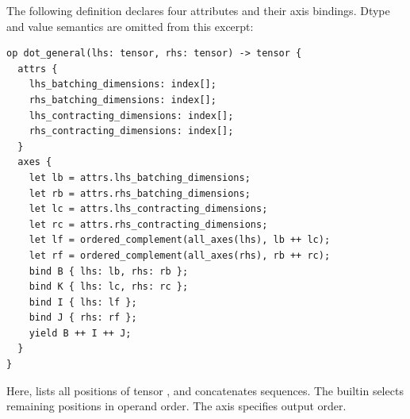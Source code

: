 The following  definition declares four attributes and their
axis bindings. Dtype and value semantics are omitted from this excerpt:
\clearpage
\begin{codeblock}[H]
\begin{lstlisting}[language=TEPL]
op dot_general(lhs: tensor, rhs: tensor) -> tensor {
  attrs {
    lhs_batching_dimensions: index[];
    rhs_batching_dimensions: index[];
    lhs_contracting_dimensions: index[];
    rhs_contracting_dimensions: index[];
  }
  axes {
    let lb = attrs.lhs_batching_dimensions;
    let rb = attrs.rhs_batching_dimensions;
    let lc = attrs.lhs_contracting_dimensions;
    let rc = attrs.rhs_contracting_dimensions;
    let lf = ordered_complement(all_axes(lhs), lb ++ lc);
    let rf = ordered_complement(all_axes(rhs), rb ++ rc);
    bind B { lhs: lb, rhs: rb };
    bind K { lhs: lc, rhs: rc };
    bind I { lhs: lf };
    bind J { rhs: rf };
    yield B ++ I ++ J;
  }
}
\end{lstlisting}
\end{codeblock}
Here,  lists all positions of tensor , and \code{++}
concatenates sequences. The builtin  selects remaining
positions in operand order. The axis  specifies output order.

